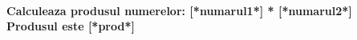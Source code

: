 \documentclass{exam}
\begin{document}
\paragraph{
Calculeaza produsul numerelor: [*numarul1*] * [*numarul2*]\\
Produsul este [*prod*]
}
\end{document}
